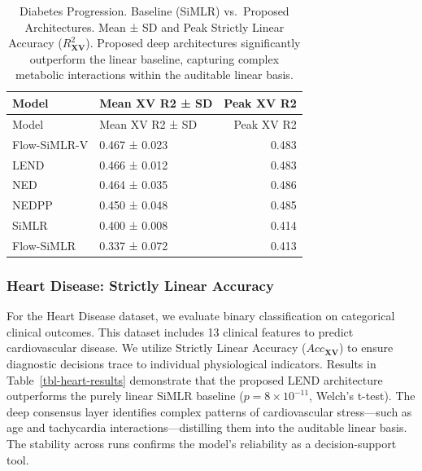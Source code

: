 \documentclass[
  letterpaper,
]{report}
\begin{document}
\begin{longtable}[]{@{}llr@{}}
\caption{Diabetes Progression. Baseline (SiMLR) vs.~Proposed
Architectures. Mean ± SD and Peak Strictly Linear Accuracy
(\(R^2_{\mathbf{X}\mathbf{V}}\)). Proposed deep architectures
significantly outperform the linear baseline, capturing complex
metabolic interactions within the auditable linear
basis.}\label{tbl-diabetes-results}\tabularnewline
\toprule\noalign{}
Model & Mean XV R2 ± SD & Peak XV R2 \\
\midrule\noalign{}
\endfirsthead
\toprule\noalign{}
Model & Mean XV R2 ± SD & Peak XV R2 \\
\midrule\noalign{}
\endhead
\bottomrule\noalign{}
\endlastfoot
Flow-SiMLR-V & 0.467 ± 0.023 & 0.483 \\
LEND & 0.466 ± 0.012 & 0.483 \\
NED & 0.464 ± 0.035 & 0.486 \\
NEDPP & 0.450 ± 0.048 & 0.485 \\
SiMLR & 0.400 ± 0.008 & 0.414 \\
Flow-SiMLR & 0.337 ± 0.072 & 0.413 \\
\end{longtable}

\subsubsection{Heart Disease: Strictly Linear
Accuracy}\label{heart-disease-strictly-linear-accuracy}

For the Heart Disease dataset, we evaluate binary classification on
categorical clinical outcomes. This dataset includes 13 clinical
features to predict cardiovascular disease. We utilize Strictly Linear
Accuracy (\(Acc_{\mathbf{X}\mathbf{V}}\)) to ensure diagnostic decisions
trace to individual physiological indicators. Results in
Table~\ref{tbl-heart-results} demonstrate that the proposed LEND
architecture outperforms the purely linear SiMLR baseline
(\(p = 8 \times 10^{-11}\), Welch's t-test). The deep consensus layer
identifies complex patterns of cardiovascular stress---such as age and
tachycardia interactions---distilling them into the auditable linear
basis. The stability across runs confirms the model's reliability as a
decision-support tool.
\end{document}
